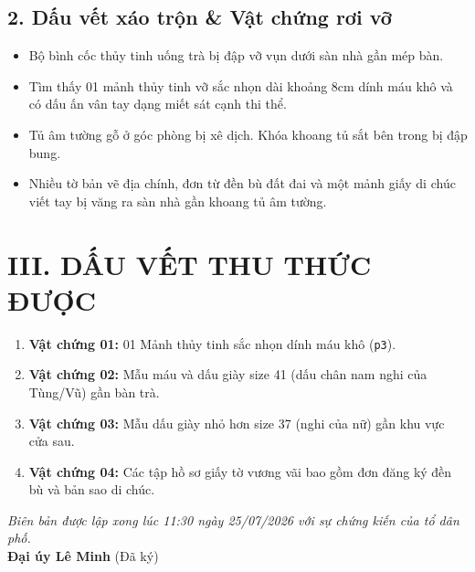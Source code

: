 \documentclass[12pt,a4paper]{article}
\begin{document}
\subsection*{2. Dấu vết xáo trộn \& Vật chứng rơi vỡ}
\begin{itemize}
    \item Bộ bình cốc thủy tinh uống trà bị đập vỡ vụn dưới sàn nhà gần mép bàn.
    \item Tìm thấy 01 mảnh thủy tinh vỡ sắc nhọn dài khoảng 8cm dính máu khô và có dấu ấn vân tay dạng miết sát cạnh thi thể.
    \item Tủ âm tường gỗ ở góc phòng bị xê dịch. Khóa khoang tủ sắt bên trong bị đập bung.
    \item Nhiều tờ bản vẽ địa chính, đơn từ đền bù đất đai và một mảnh giấy di chúc viết tay bị văng ra sàn nhà gần khoang tủ âm tường.
\end{itemize}

\section*{III. DẤU VẾT THU THỨC ĐƯỢC}
\begin{enumerate}
    \item \textbf{Vật chứng 01:} 01 Mảnh thủy tinh sắc nhọn dính máu khô (\texttt{p3}).
    \item \textbf{Vật chứng 02:} Mẫu máu và dấu giày size 41 (dấu chân nam nghi của Tùng/Vũ) gần bàn trà.
    \item \textbf{Vật chứng 03:} Mẫu dấu giày nhỏ hơn size 37 (nghi của nữ) gần khu vực cửa sau.
    \item \textbf{Vật chứng 04:} Các tập hồ sơ giấy tờ vương vãi bao gồm đơn đăng ký đền bù và bản sao di chúc.
\end{enumerate}

\vspace{1cm}

\begin{center}
    \textit{Biên bản được lập xong lúc 11:30 ngày 25/07/2026 với sự chứng kiến của tổ dân phố.}\\
    \vspace{1cm}
    \textbf{Đại úy Lê Minh} (Đã ký)
\end{center}
\end{document}
